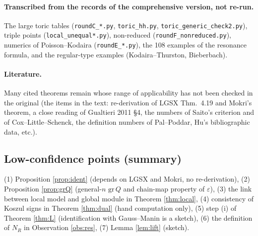 \paragraph{Transcribed from the records of the comprehensive version, not re-run.} The large toric tables (\texttt{roundC\_*.py}, \texttt{toric\_hh.py}, \texttt{toric\_generic\_check2.py}), triple points (\texttt{local\_unequal*.py}), non-reduced (\texttt{roundF\_nonreduced.py}), numerics of Poisson--Kodaira (\texttt{roundE\_*.py}), the 108 examples of the resonance formula, and the regular-type examples (Kodaira--Thurston, Bieberbach).
\paragraph{Literature.} Many cited theorems remain whose range of applicability has not been checked in the original (the \tQ items in the text: re-derivation of LGSX Thm.~4.19 and Mokri's theorem, a close reading of Gualtieri 2011 \S4, the numbers of Saito's criterion and of Cox--Little--Schenck, the definition numbers of Pal--Poddar, Hu's bibliographic data, etc.).

\subsection{Low-confidence points (summary)}
(1) Proposition \ref{prop:ident} (depends on LGSX and Mokri, no re-derivation), (2) Proposition \ref{prop:grQ} (general-$n$ $\mathrm{gr}\,Q$ and chain-map property of $\varepsilon$), (3) the link between local model and global module in Theorem \ref{thm:local}, (4) consistency of Koszul signs in Theorem \ref{thm:dual} (hand computation only), (5) step (i) of Theorem \ref{thm:L} (identification with Gauss--Manin is a sketch), (6) the definition of $N_R$ in Observation \ref{obs:res}, (7) Lemma \ref{lem:lift} (sketch).

